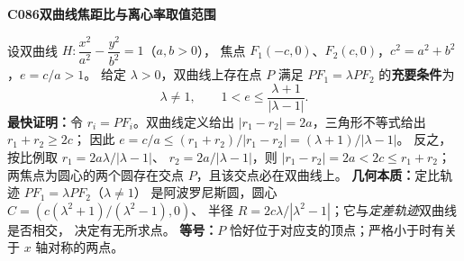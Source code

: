 \textbf{C086\quad 双曲线焦距比与离心率取值范围}

设双曲线 $H:\dfrac{x^2}{a^2}-\dfrac{y^2}{b^2}=1$（$a,b>0$），
焦点 $F_1(-c,0)$、$F_2(c,0)$，$c^2=a^2+b^2$，$e=c/a>1$。
给定 $\lambda>0$，双曲线上存在点 $P$ 满足
$PF_1=\lambda PF_2$ 的\textbf{充要条件}为
\[
\boxed{\lambda\ne1,\qquad 1<e\le\frac{\lambda+1}{|\lambda-1|}}.
\]
\textbf{最快证明：}令 $r_i=PF_i$。双曲线定义给出
$|r_1-r_2|=2a$，三角形不等式给出 $r_1+r_2\ge 2c$；
因此 $e=c/a\le (r_1+r_2)/|r_1-r_2|=(\lambda+1)/|\lambda-1|$。
反之，按比例取 $r_1=2a\lambda/|\lambda-1|$、
$r_2=2a/|\lambda-1|$，则 $|r_1-r_2|=2a<2c\le r_1+r_2$；
两焦点为圆心的两个圆存在交点 $P$，且该交点必在双曲线上。
\textbf{几何本质：}定比轨迹 $PF_1=\lambda PF_2$（$\lambda\ne1$）
是阿波罗尼斯圆，圆心 $C=(c(\lambda^2+1)/(\lambda^2-1),0)$、
半径 $R=2c\lambda/|\lambda^2-1|$；它与\emph{定差轨迹}双曲线是否相交，
决定有无所求点。
\textbf{等号：}$P$ 恰好位于对应支的顶点；严格小于时有关于 $x$ 轴对称的两点。
